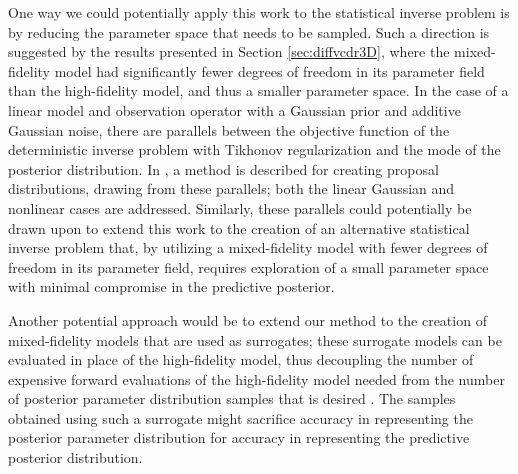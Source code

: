 One way we could potentially apply this work to the statistical inverse problem is by reducing the parameter space that needs to be sampled. Such a direction is suggested by the results presented in Section \ref{sec:diffvcdr3D}, where the mixed-fidelity model had significantly fewer degrees of freedom in its parameter field than the high-fidelity model, and thus a smaller parameter space. In the case of a linear model and observation operator with a Gaussian prior and additive Gaussian noise, there are parallels between the objective function of the deterministic inverse problem with Tikhonov regularization and the mode of the posterior distribution. In \cite{Martetal12}, a method is described for creating proposal distributions, drawing from these parallels; both the linear Gaussian and nonlinear cases are addressed. Similarly, these parallels could potentially be drawn upon to extend this work to the creation of an alternative statistical inverse problem that, by utilizing a mixed-fidelity model with fewer degrees of freedom in its parameter field, requires exploration of a small parameter space with minimal compromise in the predictive posterior.

Another potential approach would be to extend our method to the creation of mixed-fidelity models that are used as surrogates; these surrogate models can be evaluated in place of the high-fidelity model, thus decoupling the number of expensive forward evaluations of the high-fidelity model needed from the number of posterior parameter distribution samples that is desired \cite{Con14}. The samples obtained using such a surrogate might sacrifice accuracy in representing the posterior parameter distribution for accuracy in representing the predictive posterior distribution. 


